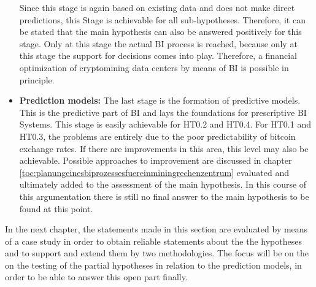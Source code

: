 \begin{itemize}
    Since this stage is again based on existing data and does not make direct predictions, this
    Stage is achievable for all sub-hypotheses. Therefore, it can be stated that the main hypothesis can also be answered positively for this stage.
    Only at this stage the actual \ac{BI} process is reached, because only at this stage the support for decisions comes into play.
    Therefore, a financial optimization of cryptomining data centers by means of
    \ac{BI} is possible in principle.
    \item \textbf{Prediction models: }The last stage is the formation of predictive models. This is the predictive part of
    \ac{BI} and lays the foundations for prescriptive \ac{BI} Systems. This stage is easily achievable for \ac{HT0.2} and \ac{HT0.4}.
    For \ac{HT0.1} and \ac{HT0.3}, the problems are entirely due to the poor predictability of bitcoin
    exchange rates. If there are improvements in this area, this level may also be achievable.
    Possible approaches to improvement are discussed in chapter \ref{toc:planungeinesbiprozessesfuereinminingrechenzentrum}
    evaluated and ultimately added to the assessment of the main hypothesis. In this course of this argumentation there is still
    no final answer to the main hypothesis to be found at this point.
\end{itemize}

In the next chapter, the statements made in this section are evaluated by means of a case study in order to obtain reliable statements about the
the hypotheses and to support and extend them by two methodologies. The focus will be on the
on the testing of the partial hypotheses in relation to the prediction models, in order to be able to answer this open part
finally.